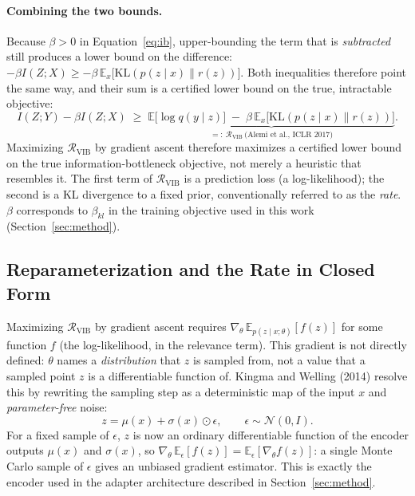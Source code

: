 \documentclass[11pt,a4paper,oneside]{article}
\begin{document}
\paragraph{Combining the two bounds.} Because $\beta>0$ in Equation~\eqref{eq:ib}, upper-bounding the
term that is \emph{subtracted} still produces a lower bound on the difference: $-\beta I(Z;X) \ge
-\beta\,\mathbb E_x\big[\mathrm{KL}(p(z\mid x)\|r(z))\big]$. Both inequalities therefore point the
same way, and their sum is a certified lower bound on the true, intractable objective:
\begin{equation}
I(Z;Y) - \beta I(Z;X) \;\ge\;
\underbrace{\mathbb E\big[\log q(y\mid z)\big] \;-\; \beta\,\mathbb E_x\big[\mathrm{KL}(p(z\mid x)\|r(z))\big]}_{=:\ \mathcal R_{\text{VIB}}\ \text{(Alemi et al., ICLR 2017)}}.
\label{eq:rvib}
\end{equation}
Maximizing $\mathcal R_{\text{VIB}}$ by gradient ascent therefore maximizes a certified lower bound on
the true information-bottleneck objective, not merely a heuristic that resembles it. The first term
of $\mathcal R_{\text{VIB}}$ is a prediction loss (a log-likelihood); the second is a KL divergence to
a fixed prior, conventionally referred to as the \emph{rate}. $\beta$ corresponds to $\beta_{kl}$ in
the training objective used in this work (Section~\ref{sec:method}).

\subsection{Reparameterization and the Rate in Closed Form}
\label{sec:ib-reparam}

Maximizing $\mathcal R_{\text{VIB}}$ by gradient ascent requires $\nabla_\theta\,\mathbb
E_{p(z\mid x;\theta)}[f(z)]$ for some function $f$ (the log-likelihood, in the relevance term). This
gradient is not directly defined: $\theta$ names a \emph{distribution} that $z$ is sampled from, not
a value that a sampled point $z$ is a differentiable function of. Kingma and Welling (2014) resolve
this by rewriting the sampling step as a deterministic map of the input $x$ and \emph{parameter-free}
noise:
\begin{equation}
z = \mu(x) + \sigma(x)\odot\epsilon, \qquad \epsilon \sim \mathcal N(0,I).
\label{eq:reparam}
\end{equation}
For a fixed sample of $\epsilon$, $z$ is now an ordinary differentiable function of the encoder
outputs $\mu(x)$ and $\sigma(x)$, so $\nabla_\theta\,\mathbb E_\epsilon[f(z)] = \mathbb
E_\epsilon[\nabla_\theta f(z)]$: a single Monte Carlo sample of $\epsilon$ gives an unbiased gradient
estimator. This is exactly the encoder used in the adapter architecture described in
Section~\ref{sec:method}.
\end{document}
